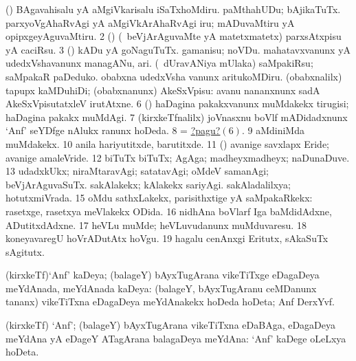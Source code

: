 \noindent
\gl{\pagu}
\bmng
\bnum
{}  (\AmA) 
\banum
{} BAgavahisalu yA aMgiVkarisalu iSaTxhoMdiru. 
 paMthahUDu; bAjikaTuTx. 
 parxyoVgAhaRvAgi yA aMgiVkArAhaRvAgi iru; mADuvaMtiru yA opipxgeyAguvaMtiru. 
\eanum
\numie
\num{2}  (\AmA) (\kanmu\ beVjArAguvaMte yA matetxmatetx) parxsAtxpisu yA caciRsu. 
\num{3}  (\AmA) kADu yA goNaguTuTx. 
  
\banum
{} gamanisu; noVDu. 
 mahatavxvanunx yA udedxVshavanunx managANu, ari. 
 (\kanmu\ dUravANiya mUlaka) saMpakiRsu; saMpakaR paDeduko. 
\eanum
\numie
{}  
\banum
{} obabxna udedxVsha \mo vanunx aritukoMDiru. 
 (obabxnalilx) tapupx kaMDuhiDi; (obabxnanunx) AkeSxVpisu:  avanu nananxnunx sadA AkeSxVpisutatxleV irutAtxne. 
\hypertarget{on2pagu6}{} 
\eanum
\numie
\num{6}  (\nw) haDagina pakakxvanunx muMdakekx tirugisi; haDagina pakakx muMdAgi. 
\num{7}  (kirxkeTfnalilx) joVnasxnu boVlf mADidadxnunx `Anf' seYDfge nAlukx ranunx hoDeda. 
\num{8}  = \hyperlink{on2pagu6}{?pagu?\((6)\)}. 
\num{9}  aMdiniMda muMdakekx. 
\num{10}  anila hariyutitxde, barutitxde. 
\num{11}  (\ashi) avanige savxlapx Eride; avanige amaleVride. 
\num{12}  biTuTx biTuTx; AgAga; madheyxmadheyx; naDunaDuve. 
\num{13}  udadxkUkx; niraMtaravAgi; satatavAgi; oMdeV samanAgi; beVjArAguvaSuTx. 
  
\banum
{} sakAlakekx; kAlakekx sariyAgi. 
 sakAladalilxya; hotutxmiVrada. 
\eanum
\numie
\num{15}  oMdu sathxLakekx, parisithxtige yA saMpakaRkekx:  rasetxge, rasetxya meVlakekx ODida. 
\num{16}  nidhAna boVlarf Iga baMdidAdxne, ADutitxdAdxne. 
\num{17}  heVLu muMde; heVLuvudanunx muMduvaresu. 
\num{18}  koneyavaregU hoVrADutAtx hoVgu. 
\num{19}  hagalu cenAnxgi Eritutx, sAkaSuTx sAgitutx. 
\enum
\emng
\eentry

\bentry
{}
\gl{\gu}
\bmng
(kirxkeTf)`Anf' kaDeya; (balageY) bAyxTugArana vikeTiTxge eDagaDeya meYdAnada, meYdAnada kaDeya:  (balageY, bAyxTugAranu ceMDanunx tananx) vikeTiTxna eDagaDeya meYdAnakekx hoDeda hoDeta; Anf DerxYvf. 
\emng
\eentry

\bentry
{}
\gl{\nA}
\bmng
(kirxkeTf) `Anf'; (balageY) bAyxTugArana vikeTiTxna eDaBAga, eDagaDeya meYdAna yA eDageY ATagArana balagaDeya meYdAna:  `Anf' kaDege oLeLxya hoDeta. 
\emng
\eentry

